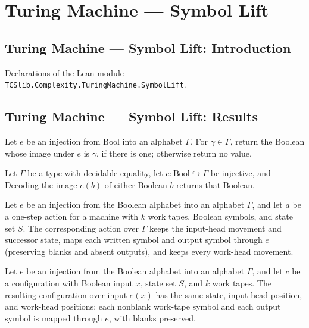 \section{Turing Machine --- Symbol Lift}
\subsection*{Turing Machine --- Symbol Lift: Introduction}

Declarations of the Lean module \texttt{TCSlib.Complexity.TuringMachine.SymbolLift}.

\subsection*{Turing Machine --- Symbol Lift: Results}

\begin{definition}
\label{Turing.decodeBool}
\leanok
Let $e$ be an injection from $\mathrm{Bool}$ into an alphabet
$\Gamma$. For $\gamma\in\Gamma$, return the Boolean whose image under $e$ is $\gamma$,
if there is one; otherwise return no value.
\end{definition}

\begin{lemma}
\label{Turing.decodeBool_apply}
\leanok
{}
Let $\Gamma$ be a type with decidable equality, let $e:\mathrm{Bool}\hookrightarrow\Gamma$ be injective, and
Decoding the image $e(b)$ of either Boolean $b$ returns that Boolean.
\end{lemma}

\begin{definition}
\label{Turing.Action.liftSymbols}
\leanok
{}
Let $e$ be an injection from the Boolean alphabet into an alphabet $\Gamma$, and let $a$
be a one-step action for a machine with $k$ work tapes, Boolean symbols, and state set
$S$. The corresponding action over $\Gamma$ keeps the input-head movement and successor
state, maps each written symbol and output symbol through $e$ (preserving blanks and
absent outputs), and keeps every work-head movement.
\end{definition}

\begin{definition}
\label{Turing.Cfg.liftSymbols}
\leanok
{}
Let $e$ be an injection from the Boolean alphabet into an alphabet $\Gamma$, and let $c$
be a configuration with Boolean input $x$, state set $S$, and $k$ work tapes. The
resulting configuration over input $e(x)$ has the same state, input-head position, and
work-head positions; each nonblank work-tape symbol and each output symbol is mapped
through $e$, with blanks preserved.
\end{definition}


